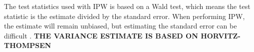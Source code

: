 The test statistics used with IPW is based on a Wald test\cite{survivalVignette}, which means the test statistic is the estimate divided by the standard error. When performing IPW, the estimate will remain unbiased, but estimating the standard error can be difficult \cite{austin2016variance}. \textbf{THE VARIANCE ESTIMATE IS BASED ON HORVITZ-THOMPSEN}




